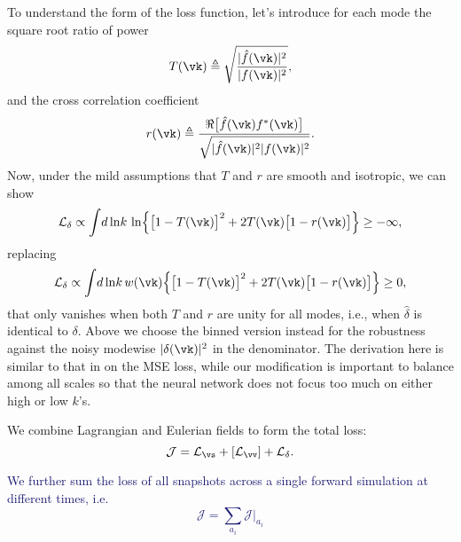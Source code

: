 \documentclass[modern, trackchanges, dvipsnames]{aastex631}
\renewcommand{\d}{d}
\newcommand{\cJ}{\mathcal{J}}
\newcommand{\cL}{\mathcal{L}}
\newcommand{\YZ}[1]{\textcolor{MidnightBlue}{#1}}
\begin{document}
To understand the form of the loss function, let's introduce for each
mode the square root ratio of power
%
\begin{equation}
T(\vk) \triangleq
\sqrt{\frac{|\hat f(\vk)|^2}{|f(\vk)|^2}},
\end{equation}
%
and the cross correlation coefficient
%
\begin{equation}
r(\vk) \triangleq
\frac{\Re \bigl[ \hat f(\vk) f^*(\vk) \bigr]}
     {\sqrt{|\hat f(\vk)|^2 |f(\vk)|^2}}.
\end{equation}
%
Now, under the mild assumptions that $T$ and $r$ are smooth and
isotropic, we can show
%
\begin{equation}
\cL_\delta \propto \int \!\d\ln\!k\, \ln
\Bigl\{ \bigl[ 1 - T(\vk) \bigr]^2
  + 2 T(\vk) \bigl[ 1 - r(\vk) \bigr] \Bigr\} \geq -\infty,
\end{equation}
%
replacing
%
\begin{equation}
\cL_\delta \propto \int \!\d\ln\!k\, w(\vk)
\Bigl\{ \bigl[ 1 - T(\vk) \bigr]^2
  + 2 T(\vk) \bigl[ 1 - r(\vk) \bigr] \Bigr\} \geq 0,
\end{equation}
%
that only vanishes when both $T$ and $r$ are unity for all modes, i.e.,
when $\hat\delta$ is identical to $\delta$.
Above we choose the binned version instead for the robustness against
the noisy modewise $|\delta(\vk)|^2$ in the denominator.
The derivation here is similar to that in \citet{HeEtAl2019} on the MSE
loss, while our modification is important to balance among all scales so
that the neural network does not focus too much on either high or low
$k$'s.

We combine Lagrangian and Eulerian fields to form the total loss:
%
\begin{equation}
\cJ = \cL_\vs + [\cL_\vv] + \cL_\delta.
\end{equation}
%

\YZ{We further sum the loss of all snapshots across a single forward simulation
at different times, i.e.
\begin{equation}
\cJ = \sum_{a_i} \cJ |_{a_i}
\end{equation}
}
\end{document}

